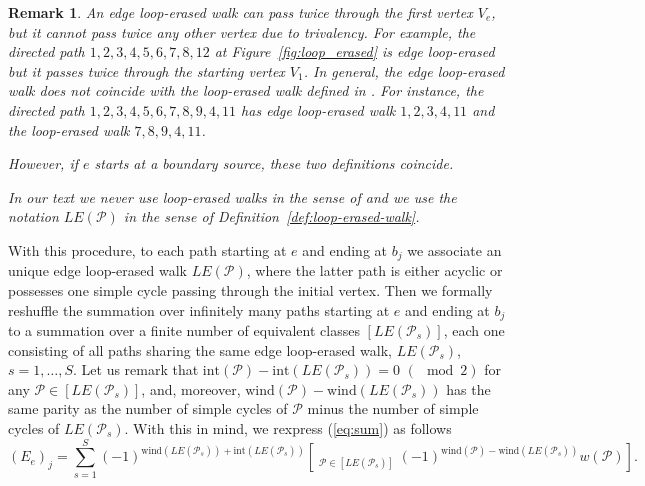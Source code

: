 \documentclass[11pt]{amsart}
\theoremstyle{plain}
\numberwithin{equation}{section}
\newtheorem{remark}{Remark}[subsection]
\begin{document}
\begin{remark}
An edge loop-erased walk can pass twice through the first vertex $V_e$, but it cannot pass twice any other vertex due to  trivalency.
For example, the directed path $1,2,3,4,5,6,7,8,12$ at Figure~\ref{fig:loop_erased} is edge loop-erased but it passes twice through the starting 
vertex $V_1$.
In general, the edge loop-erased walk does not coincide with the loop-erased walk defined in \cite{Fom, Law}. For instance, the directed path
$1,2,3,4,5,6,7,8,9,4,11$ has edge loop-erased walk $1,2,3,4,11$ and the loop-erased walk $7,8,9,4,11$. 

However, if $e$ starts at a boundary source, these two definitions coincide.  

In our text we never use loop-erased walks in the sense of \cite{Fom} and we use the notation $LE({\mathcal P})$ in the sense of 
Definition~\ref{def:loop-erased-walk}. 
\end{remark}

\begin{figure}%
\end{figure}

With this procedure, to each path starting at $e$ and ending at $b_j$ we associate an unique edge loop-erased walk $LE({\mathcal P})$, where the latter path is either acyclic or possesses one simple cycle passing through the initial vertex.
Then we formally reshuffle the summation over 
infinitely many paths starting at $e$ and ending at $b_j$ to a summation over a finite number of equivalent classes  $[LE({\mathcal P}_s)]$, each one consisting of all paths sharing the 
same edge loop-erased walk, $LE({\mathcal P}_s)$, $s=1,\ldots, S$. Let us remark that 
$ \mbox{int}({\mathcal P})-\mbox{int}(LE({\mathcal P}_s))=0 \,\,(\!\!\!\!\mod 2) $ for any ${\mathcal P}\in [LE({\mathcal P}_s)]$, and, moreover, 
$ \mbox{wind}({\mathcal P})-\mbox{wind}(LE({\mathcal P}_s))$ has the same parity as the number of simple cycles of ${\mathcal P}$ minus the number of 
simple cycles of $LE({\mathcal P}_s)$.
With this in mind, we rexpress (\ref{eq:sum}) as follows
\begin{equation}\label{eq:sum2}
\left(E_{e}\right)_{j} = \sum\limits_{s=1}^S (-1)^{\mbox{wind}(LE({\mathcal P}_s))+ \mbox{int}(LE({\mathcal P}_s))}\left[ 
\mathop{\sum\limits_{{\mathcal P}:e\rightarrow b_{j}}}_{{\mathcal P}\in [LE({\mathcal P}_s)] } (-1)^{\mbox{wind}({\mathcal P})-\mbox{wind}(LE({\mathcal P}_s))  } 
w({\mathcal P}) \right].
\end{equation}
\end{document}
